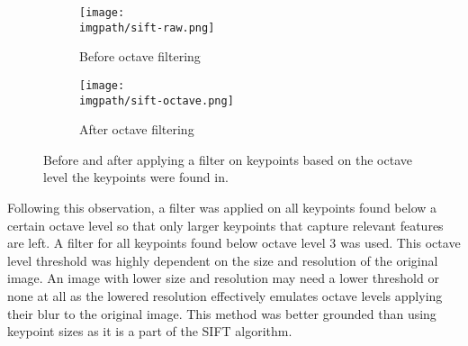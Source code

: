 \begin{figure}[H]
	\begin{subfigure}{0.5\textwidth}
	\texttt{[image: \\imgpath/sift-raw.png]}
	\caption{Before octave filtering}
	\end{subfigure}
	\hspace*{\fill}
	\begin{subfigure}{0.5\textwidth}
	\texttt{[image: \\imgpath/sift-octave.png]}
	\caption{After octave filtering}
	\end{subfigure}
\caption{Before and after applying a filter on keypoints based on the octave level the keypoints were found in.}
\end{figure}
\noindent
Following this observation, a filter was applied on all keypoints found below a certain octave level so that only larger keypoints that capture relevant features are left. A filter for all keypoints found below octave level 3 was used. This octave level threshold was highly dependent on the size and resolution of the original image. An image with lower size and resolution may need a lower threshold or none at all as the lowered resolution effectively emulates octave levels applying their blur to the original image. This method was better grounded than using keypoint sizes as it is a part of the SIFT algorithm.


